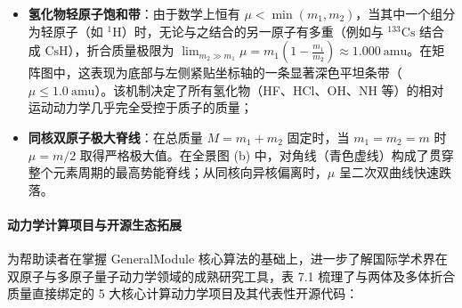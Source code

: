 \documentclass[
]{ctexbook}
\providecommand{\tightlist}{%
  \setlength{\itemsep}{0pt}\setlength{\parskip}{0pt}}
\begin{document}
\begin{itemize}
\tightlist
\item
  \textbf{氢化物轻原子饱和带}：由于数学上恒有
  \(\mu < \min(m_1, m_2)\)，当其中一个组分为轻原子（如
  \(^1\mathrm{H}\)）时，无论与之结合的另一原子有多重（例如与
  \(^{133}\mathrm{Cs}\) 结合成 \(\mathrm{CsH}\)），折合质量极限为
  \(\lim_{m_2 \gg m_1} \mu = m_1 \left(1 - \frac{m_1}{m_2}\right) \approx 1.000\ \mathrm{amu}\)。在矩阵图中，这表现为底部与左侧紧贴坐标轴的一条显著深色平坦条带（\(\mu \le 1.0\ \mathrm{amu}\)）。该机制决定了所有氢化物（HF、HCl、OH、NH
  等）的相对运动动力学几乎完全受控于质子的质量；
\item
  \textbf{同核双原子极大脊线}：在总质量 \(M = m_1 + m_2\) 固定时，当
  \(m_1 = m_2 = m\) 时 \(\mu = m/2\) 取得严格极大值。在全景图 (b)
  中，对角线（青色虚线）构成了贯穿整个元素周期的最高势能脊线；从同核向异核偏离时，\(\mu\)
  呈二次双曲线快速跌落。
\end{itemize}

\hypertarget{ux52a8ux529bux5b66ux8ba1ux7b97ux9879ux76eeux4e0eux5f00ux6e90ux751fux6001ux62d3ux5c55}{%
\paragraph{动力学计算项目与开源生态拓展}\label{ux52a8ux529bux5b66ux8ba1ux7b97ux9879ux76eeux4e0eux5f00ux6e90ux751fux6001ux62d3ux5c55}}

为帮助读者在掌握 GeneralModule
核心算法的基础上，进一步了解国际学术界在双原子与多原子量子动力学领域的成熟研究工具，表
7.1 梳理了与两体及多体折合质量直接绑定的 5
大核心计算动力学项目及其代表性开源代码：
\end{document}
